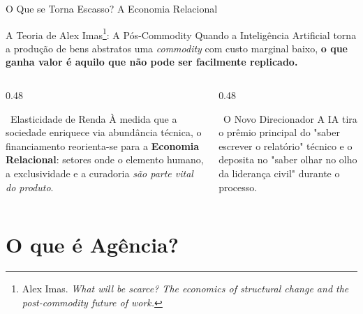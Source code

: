 \documentclass[aspectratio=169,12pt]{beamer}
\begin{document}
\begin{frame}{O Que se Torna Escasso? A Economia Relacional}
    \begin{alertblock}{A Teoria de Alex Imas\footnote{Alex Imas. \textit{What will be scarce? The economics of structural change and the post-commodity future of work.}}: A Pós-Commodity}
        Quando a Inteligência Artificial torna a produção de bens abstratos uma \textit{commodity} com custo marginal baixo, \textbf{o que ganha valor é aquilo que não pode ser facilmente replicado.}
    \end{alertblock}
    
    \vspace{0.3cm}
    \begin{columns}[T]
        \begin{column}{0.48\textwidth}
            \begin{block}{\faChartLine\, Elasticidade de Renda}
                À medida que a sociedade enriquece via abundância técnica, o financiamento reorienta-se para a \textbf{Economia Relacional}: setores onde o elemento humano, a exclusividade e a curadoria \textit{são parte vital do produto}.
            \end{block}
        \end{column}
        \begin{column}{0.48\textwidth}
            \begin{exampleblock}{\faHandsHelping\, O Novo Direcionador}
                A IA tira o prêmio principal do "saber escrever o relatório" técnico e o deposita no "saber olhar no olho da liderança civil" durante o processo.
            \end{exampleblock}
        \end{column}
    \end{columns}
\end{frame}


\section{O que é Agência?}
\end{document}
